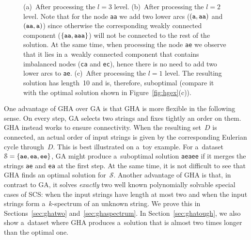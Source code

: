 \begin{figure}[!ht]
\begin{mypic}


\end{mypic}
\caption{(a)~After processing the $l=3$ level. (b)~After processing the $l=2$ level. Note that for the node {\tt aa} we add two lower arcs ($({\tt a}, {\tt aa})$ and $({\tt aa}, {\tt a})$) since otherwise the corresponding weakly connected component ($\{{\tt aa}, {\tt aaa}\}$) will not be connected to the rest of the solution. At the same time, when processing the node {\tt ae} we observe that it lies in a~weakly connected component that contains imbalanced nodes ({\tt ca} and {\tt ec}), hence there is no need to add two lower arcs to {\tt ae}. (c)~After processing the $l=1$ level. The resulting solution has length~10 and is, therefore, suboptimal (compare it with the optimal solution shown in Figure~\ref{fig:hgex}(c)).}
\label{fig:hgexa}
\end{figure}

One advantage of GHA over GA is that GHA is more flexible in the following sense. On every step, GA selects two strings and fixes tightly an order on them. GHA instead works to ensure connectivity. When the resulting set~$D$ is connected, an actual order of input strings is given by the corresponding Eulerian cycle through~$D$. This is best illustrated on a~toy example. For a~dataset $\mathcal{S}=\{{\tt ae}, {\tt ea}, {\tt ee}\}$, GA might produce a~suboptimal solution {\tt aeaee} if it merges the strings {\tt ae} and {\tt ea} at the first step. At the same time, it is not difficult to see that GHA finds an optimal solution for~$\mathcal{S}$. Another advantage of GHA is that, in contrast to GA, it solves {\em exactly} two well known polynomially solvable special cases of SCS: when the input strings have length at most two and when the input strings form a~$k$-spectrum of an unknown string. We prove this in Sections~\ref{sec:ghatwo} and~\ref{sec:ghaspectrum}. In Section~\ref{sec:ghatough}, we also show a~dataset where GHA produces a~solution that is almost two times longer than the optimal one.

